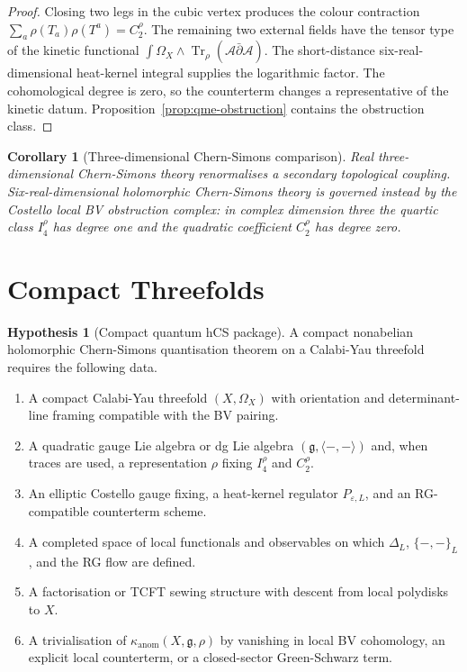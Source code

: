 \documentclass[11pt]{amsart}
\providecommand{\dbar}{\bar{\partial}}
\providecommand{\fg}{\mathfrak{g}}
\providecommand{\Tr}{\operatorname{Tr}}
\providecommand{\cA}{\mathcal{A}}
\providecommand{\kanom}{\kappa_{\operatorname{anom}}}
\theoremstyle{plain}
\newtheorem{corollary}[theorem]{Corollary}
\theoremstyle{definition}
\newtheorem{hypothesis}[theorem]{Hypothesis}
\theoremstyle{remark}
\begin{document}
\begin{proof}
Closing two legs in the cubic vertex produces the colour contraction
$\sum_a\rho(T_a)\rho(T^a)=C_2^\rho$.  The remaining two external fields
have the tensor type of the kinetic functional
$\int\Omega_X\wedge\Tr_\rho(\cA\dbar\cA)$.  The short-distance
six-real-dimensional heat-kernel integral supplies the logarithmic
factor.  The cohomological degree is zero, so the counterterm changes a
representative of the kinetic datum.  Proposition~\ref{prop:qme-obstruction}
contains the obstruction class.
\end{proof}

\begin{corollary}[Three-dimensional Chern-Simons comparison]
\label{cor:three-dimensional-cs-comparison}
Real three-dimensional Chern-Simons theory renormalises a secondary
topological coupling.  Six-real-dimensional holomorphic Chern-Simons
theory is governed instead by the Costello local BV obstruction
complex: in complex dimension three the quartic class $I_4^\rho$ has
degree one and the quadratic coefficient $C_2^\rho$ has degree zero.
\end{corollary}

\section{Compact Threefolds}
\label{sec:compact-threefolds}

\begin{hypothesis}[Compact quantum hCS package]
\label{hyp:compact-package}
A compact nonabelian holomorphic Chern-Simons quantisation theorem on a
Calabi-Yau threefold requires the following data.
\begin{enumerate}
\item A compact Calabi-Yau threefold $(X,\Omega_X)$ with orientation
and determinant-line framing compatible with the BV pairing.
\item A quadratic gauge Lie algebra or dg Lie algebra
$(\fg,\langle-,-\rangle)$ and, when traces are used, a representation
$\rho$ fixing $I_4^\rho$ and $C_2^\rho$.
\item An elliptic Costello gauge fixing, a heat-kernel regulator
$P_{\varepsilon,L}$, and an RG-compatible counterterm scheme.
\item A completed space of local functionals and observables on which
$\Delta_L$, $\{-,-\}_L$, and the RG flow are defined.
\item A factorisation or TCFT sewing structure with descent from local
polydisks to $X$.
\item A trivialisation of $\kanom(X,\fg,\rho)$ by vanishing in local BV
cohomology, an explicit local counterterm, or a closed-sector
Green-Schwarz term.
\end{enumerate}
\end{hypothesis}
\end{document}
